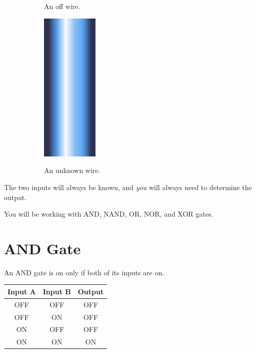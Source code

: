 \documentclass[12pt]{book}
\newcommand{\ON}{\textcolor{on}{ON}}
\newcommand{\OFF}{\textcolor{off}{OFF}}
\begin{document}
\begin{figure}[h]
\begin{subfigure}[t]{0.3\textwidth}
				An off wire.
			\end{subfigure}
			\hspace{1mm}
			\begin{subfigure}[t]{0.3\textwidth}
				\centering
				\includegraphics[width=0.3\textwidth]{UNKNOWN}

				An unknown wire.
			\end{subfigure}
		\end{figure}

		The two inputs will always be known, and \emph{you} will always need to determine the output.

		You will be working with AND, NAND, OR, NOR, and XOR gates.
		\section{AND Gate}
			An AND gate is on only if both of its inputs are on.
			\begin{center}
				\begin{tabular}{|c|c|c|}
					\hline
					\textbf{Input A} & \textbf{Input B} & \textbf{Output}\\\hline
					\OFF & \OFF & \OFF\\\hline
					\OFF & \ON & \OFF\\\hline
					\ON & \OFF & \OFF\\\hline
					\ON & \ON & \ON\\\hline
				\end{tabular}
			\end{center}
\end{document}
